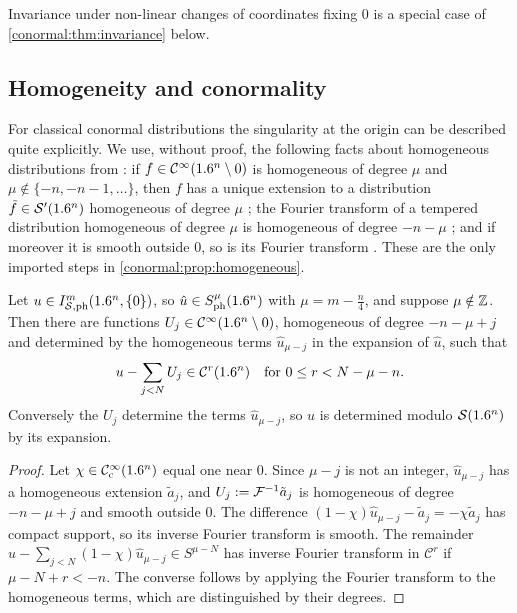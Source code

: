 Invariance under non-linear changes of coordinates fixing $0$ is a special case
of \cref{conormal:thm:invariance} below.

\subsection{Homogeneity and conormality}
For classical conormal distributions the singularity at the origin can be
described quite explicitly.  We use, without proof, the following facts about
homogeneous distributions from \cite{Hormander-I}: if $f\in\mathcal{C}^\infty(1.6^n\setminus0)$
is homogeneous of degree $\mu$ and $\mu\notin\{-n,-n-1,\dots\}$, then $f$ has a
unique extension to a distribution $\tilde f\in\mathcal{S}'(1.6^n)$ homogeneous of degree
$\mu$ \cite[Theorem~3.2.3]{Hormander-I}; the Fourier transform of a tempered
distribution homogeneous of degree $\mu$ is homogeneous of degree $-n-\mu$
\cite[Theorem~7.1.16]{Hormander-I}; and if moreover it is smooth outside $0$,
so is its Fourier transform \cite[Theorem~7.1.18]{Hormander-I}. These are the
only imported steps in \cref{conormal:prop:homogeneous}.

\begin{proposition}\label{conormal:prop:homogeneous}
  Let $u\in I^{m}_{\mathcal{S},\mathrm{ph}}(1.6^n,\{0\})$, so $\hat u\in S^{\mu}_{\mathrm{ph}}(1.6^n)$
  with $\mu=m-\frac n4$, and suppose $\mu\notin\mathbb{Z}$.  Then there are functions
  $U_j\in\mathcal{C}^\infty(1.6^n\setminus0)$, homogeneous of degree $-n-\mu+j$ and determined by
  the homogeneous terms $\hat u_{\mu-j}$ in the expansion of $\hat u$, such that
  \begin{equation*}
    u-\sum_{j<N}U_j\in\mathcal C^r(1.6^n)\quad\text{for } 0\le r<N-\mu-n.
  \end{equation*}
  Conversely the $U_j$ determine the terms $\hat u_{\mu-j}$, so $u$ is determined
  modulo $\mathcal{S}(1.6^n)$ by its expansion.
\end{proposition}
\begin{proof}
  Let $\chi\in\mathcal{C}^\infty_{\mathrm{c}}(1.6^n)$ equal one near $0$.  Since $\mu-j$ is not an integer,
  $\hat u_{\mu-j}$ has a homogeneous extension $\tilde a_j$, and
  $U_j:=\mathcal{F}^{-1}\tilde a_j$ is homogeneous of degree $-n-\mu+j$ and smooth
  outside $0$.  The difference $(1-\chi)\hat u_{\mu-j}-\tilde a_j=-\chi\tilde a_j$
  has compact support, so its inverse Fourier transform is smooth.  The remainder
  $\hat u-\sum_{j<N}(1-\chi)\hat u_{\mu-j}\in S^{\mu-N}$ has inverse Fourier
  transform in $\mathcal C^r$ if $\mu-N+r<-n$.  The converse follows by
  applying the Fourier transform to the homogeneous terms, which are
  distinguished by their degrees.
\end{proof}

